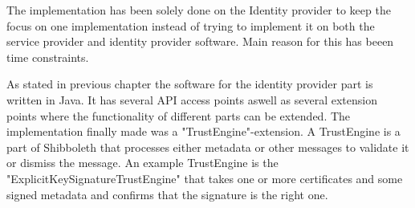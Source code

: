 The implementation has been solely done on the Identity provider to keep the focus on one implementation instead of trying to implement it on both the service provider and identity provider software.
Main reason for this has beeen time constraints.

As stated in previous chapter the software for the identity provider part is written in Java.
It has several API access points aswell as several extension points where the functionality of different parts can be extended.
The implementation finally made was a "TrustEngine"-extension.
A TrustEngine is a part of Shibboleth that processes either metadata or other messages to validate it or dismiss the message.
An example TrustEngine is the "ExplicitKeySignatureTrustEngine" that takes one or more certificates and some signed metadata and confirms that the signature is the right one. 




